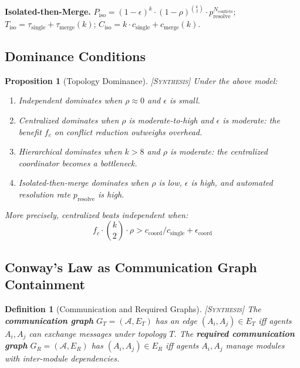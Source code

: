 \documentclass[11pt, a4paper, copyright]{googledeepmind}
\newtheorem{definition}{Definition}[section]
\newtheorem{proposition}{Proposition}[section]
\newcommand{\synthesis}{\textsc{[Synthesis]}}
\begin{document}
\medskip
\noindent\textbf{Isolated-then-Merge.}
$P_{\mathrm{iso}} = (1-\epsilon)^k \cdot (1-\rho)^{\binom{k}{2}} \cdot p_{\mathrm{resolve}}^{N_{\mathrm{conflicts}}}$;
$T_{\mathrm{iso}} = \tau_{\mathrm{single}} + \tau_{\mathrm{merge}}(k)$;
$C_{\mathrm{iso}} = k \cdot c_{\mathrm{single}} + c_{\mathrm{merge}}(k)$.

\subsection{Dominance Conditions}

\begin{proposition}[Topology Dominance] \synthesis{}
\label{prop:dominance}
Under the above model:
\begin{enumerate}[nosep]
  \item Independent dominates when $\rho \approx 0$ and $\epsilon$ is small.
  \item Centralized dominates when $\rho$ is moderate-to-high and $\epsilon$ is moderate: the benefit $f_c$ on conflict reduction outweighs overhead.
  \item Hierarchical dominates when $k > 8$ and $\rho$ is moderate: the centralized coordinator becomes a bottleneck.
  \item Isolated-then-merge dominates when $\rho$ is low, $\epsilon$ is high, and automated resolution rate $p_{\mathrm{resolve}}$ is high.
\end{enumerate}

More precisely, centralized beats independent when:
\begin{equation}
  f_c \cdot \binom{k}{2} \cdot \rho > c_{\mathrm{coord}} / c_{\mathrm{single}} + \epsilon_{\mathrm{coord}}
\end{equation}
\end{proposition}

\subsection{Conway's Law as Communication Graph Containment}

\begin{definition}[Communication and Required Graphs] \synthesis{}
The \textbf{communication graph} $G_T = (\mathcal{A}, E_T)$ has an edge $(A_i, A_j) \in E_T$ iff agents $A_i, A_j$ can exchange messages under topology $T$.
The \textbf{required communication graph} $G_R = (\mathcal{A}, E_R)$ has $(A_i, A_j) \in E_R$ iff agents $A_i, A_j$ manage modules with inter-module dependencies.
\end{definition}
\end{document}
